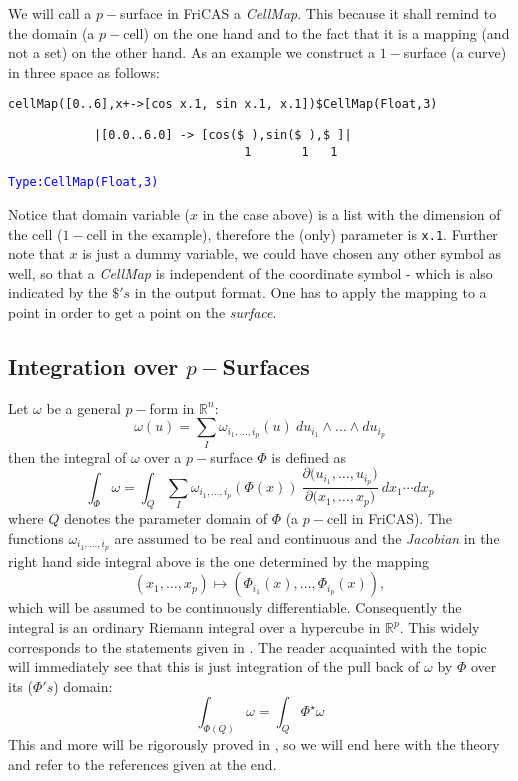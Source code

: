 \documentclass[12pt,a4paper]{article}
\newcommand{\RR}[1]{\mathbb{R}^{#1}}
\newcommand{\type}[1]{\textcolor{blue}{\tt\tiny #1}}
\begin{document}
We will call a $p-$surface in FriCAS a {\em CellMap}. This because it 
shall remind to the domain (a $p-$cell) on the one hand and to the fact 
that it is a mapping (and not a set) on the other hand. As an example
we construct a $1-$surface (a curve) in three space as follows:
\begin{lstlisting}
cellMap([0..6],x+->[cos x.1, sin x.1, x.1])$CellMap(Float,3)
\end{lstlisting} 
\begin{verbatim}
            |[0.0..6.0] -> [cos($ ),sin($ ),$ ]|
                                 1       1   1                                     
\end{verbatim}
\type{Type:CellMap(Float,3)}



Notice that domain variable ($x$ in the case above) is a list with the
dimension of the cell ($1-$cell in the example), therefore the (only)
parameter is {\tt x.1}. Further note that $x$ is just a dummy variable,
we could have chosen any other symbol as well, so that a {\em CellMap}
is independent of the coordinate symbol - which is also indicated by
the $\$'s$ in the output format. One has to apply the mapping to a 
point in order to get a point on the {\it surface}.
%
\subsection{Integration over $p-$Surfaces}
Let $\omega$ be a general $p-$form in $\RR n$:
\begin{displaymath}
   \omega(u) = \sum_{I} \omega_{i_1,\ldots,i_p}(u)\ du_{i_1}
   \wedge\ldots\wedge du_{i_p}
\end{displaymath}
then the integral of $\omega$ over a $p-$surface $\Phi$ is defined as
\begin{displaymath}
 \int_{\Phi} \omega = \int_{Q} 
   \sum_{I} \omega_{i_1,\ldots,i_p}(\Phi(x))
   \ \frac{\partial{(u_{i_1},\ldots,u_{i_p}})}{\partial{(x_1,\ldots,x_p})}
   \ dx_{1} \cdots dx_{p} 
\end{displaymath}
where $Q$ denotes the parameter domain of $\Phi$ (a $p-$cell in FriCAS).
The functions $\omega_{i_1,\ldots,i_p}$ are assumed to be real and
continuous and the {\em Jacobian} in the right hand side integral above
is the one determined by the mapping
\begin{displaymath}
     (x_1,\ldots,x_p) \mapsto (\Phi_{i_1}(x),\ldots,\Phi_{i_p}(x)),
\end{displaymath} 
which will be assumed to be continuously differentiable. Consequently
the integral is an ordinary Riemann integral over a hypercube in $\RR p$.
This widely corresponds to the statements given in \cite{PMA}. The
reader acquainted with the topic will immediately see that this is just
integration of the pull back of $\omega$ by $\Phi$ over its ($\Phi's$) 
domain:
\begin{displaymath}
    \int_{\Phi(Q)} \omega = \int_{Q} \Phi^{\star}\omega
\end{displaymath}
This and more will be rigorously proved in \cite{PMA}, so we will end
here with the theory and refer to the references given at the end.
%
\end{document}
